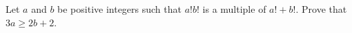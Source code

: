 Let $a$ and $b$ be positive integers such that $a! b!$ is a multiple of $a! + b!$. Prove that $3a \geq 2b + 2$.
